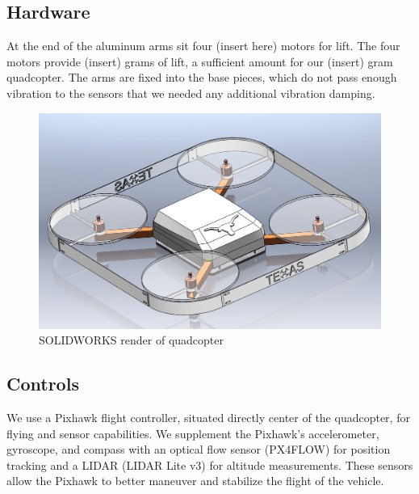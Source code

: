 \documentclass[12pt]{article}
\begin{document}
\subsection{Hardware} 
At the end of the aluminum arms sit four (insert here) motors for lift. The four motors provide (insert) grams of lift, a sufficient amount for our (insert) gram quadcopter. The arms are fixed into the base pieces, which do not pass enough vibration to the sensors that we needed any additional vibration damping. 

\begin{figure}[!htbp]
\begin{center}
\includegraphics[width=1\textwidth]{render}
\caption*{SOLIDWORKS render of quadcopter}
\end{center}
\end{figure}
\subsection{Controls}
We use a Pixhawk flight controller, situated directly center of the quadcopter, for flying and sensor capabilities. We supplement the Pixhawk's accelerometer, gyroscope, and compass with an optical flow sensor (PX4FLOW) for position tracking and a LIDAR (LIDAR Lite v3) for altitude measurements. These sensors allow the Pixhawk to better maneuver and stabilize the flight of the vehicle. 
\end{document}

